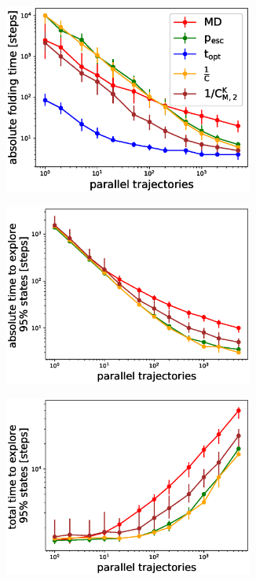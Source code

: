 \begin{figure}[t]
  \begin{subfigure}[t]{0.5\textwidth}
    \includegraphics[width=0.9\textwidth]{figures/GTT_6_steps10000_scaling_fold0.eps}    
  \end{subfigure}
  \begin{subfigure}[t]{0.5\textwidth}
    \includegraphics[width=0.9\textwidth]{figures/1FME_6_steps10000_scaling_explore.eps}
  \end{subfigure}
  \begin{subfigure}[t]{0.5\textwidth}
    \includegraphics[width=0.9\textwidth]{figures/1FME_6_steps10000_scaling_explore_total.eps}

\end{subfigure}
\end{figure}
